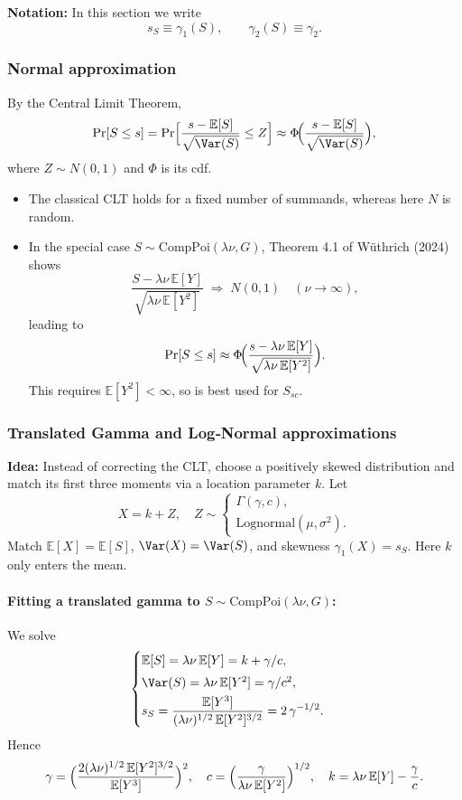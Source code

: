 \documentclass[11pt]{article}
\begin{document}
\noindent\textbf{Notation:} In this section we write
\[
s_S \equiv \gamma_1(S), 
\qquad
\gamma_2(S)\equiv\gamma_2.
\]

\subsubsection{Normal approximation}

By the Central Limit Theorem,
\[
\Pr[S\le s]
=\Pr\Bigl[\frac{s - \mathbb{E}[S]}{\sqrt{\Var(S)}} \le Z\Bigr]
\approx \Phi\!\Bigl(\frac{s - \mathbb{E}[S]}{\sqrt{\Var(S)}}\Bigr),
\]
where \(Z\sim N(0,1)\) and \(\Phi\) is its cdf.

\begin{itemize}
  \item The classical CLT holds for a fixed number of summands, whereas here \(N\) is random.
  \item In the special case \(S\sim\mathrm{CompPoi}(\lambda\nu,G)\), Theorem 4.1 of Wüthrich (2024) shows
  \[
    \frac{S - \lambda\nu\,\mathbb{E}[Y]}{\sqrt{\lambda\nu\,\mathbb{E}[Y^2]}}
    \;\Longrightarrow\;N(0,1)
    \quad(\nu\to\infty),
  \]
  leading to
  \[
    \Pr[S\le s]\approx
    \Phi\!\Bigl(\frac{s - \lambda\nu\,\mathbb{E}[Y]}{\sqrt{\lambda\nu\,\mathbb{E}[Y^2]}}\Bigr).
  \]
  This requires \(\mathbb{E}[Y^2]<\infty\), so is best used for \(S_{sc}\).
\end{itemize}

\subsubsection{Translated Gamma and Log‐Normal approximations}

\textbf{Idea:}  Instead of correcting the CLT, choose a positively skewed distribution and match its first three moments via a location parameter \(k\).  Let
\[
X = k + Z,
\quad
Z\sim
\begin{cases}
\Gamma(\gamma,c),\\
\mathrm{Lognormal}(\mu,\sigma^2).
\end{cases}
\]
Match \(\mathbb{E}[X]=\mathbb{E}[S]\), \(\Var(X)=\Var(S)\), and skewness \(\gamma_1(X)=s_S\).  Here \(k\) only enters the mean.

\paragraph{Fitting a translated gamma to \(S\sim\mathrm{CompPoi}(\lambda\nu,G)\):}  
We solve
\[
\begin{cases}
\mathbb{E}[S]=\lambda\nu\,\mathbb{E}[Y] = k + \gamma/c,\\[0.3em]
\Var(S)=\lambda\nu\,\mathbb{E}[Y^2] = \gamma/c^2,\\[0.3em]
s_S
=\displaystyle\frac{\mathbb{E}[Y^3]}{(\lambda\nu)^{1/2}\,\mathbb{E}[Y^2]^{3/2}}
=2\,\gamma^{-1/2}.
\end{cases}
\]
Hence
\[
\gamma
=\Bigl(\frac{2(\lambda\nu)^{1/2}\,\mathbb{E}[Y^2]^{3/2}}{\mathbb{E}[Y^3]}\Bigr)^2,
\quad
c=\Bigl(\frac{\gamma}{\lambda\nu\,\mathbb{E}[Y^2]}\Bigr)^{1/2},
\quad
k=\lambda\nu\,\mathbb{E}[Y]-\frac{\gamma}{c}.
\]
\end{document}
